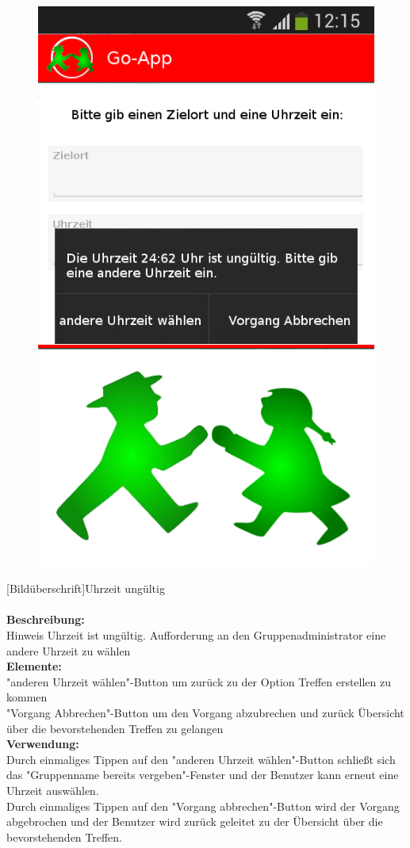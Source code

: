 \begin{figure}
	\includegraphics[scale =1]{resources/images/treffpunkt_erstellen_ungueltig_Zeit.png}
\end{figure}
[Bildüberschrift]Uhrzeit ungültig\\ \\
\textbf{Beschreibung:}\\
Hinweis Uhrzeit ist ungültig. Aufforderung an den Gruppenadministrator eine andere Uhrzeit zu wählen\\
\textbf{Elemente:}\\
"anderen Uhrzeit wählen"-Button um zurück zu der Option Treffen erstellen zu kommen\\
"Vorgang Abbrechen"-Button um den Vorgang abzubrechen und zurück Übersicht über die bevorstehenden Treffen zu gelangen\\
\textbf{Verwendung:}\\
Durch einmaliges Tippen auf den "anderen Uhrzeit wählen"-Button schließt sich das "Gruppenname bereits vergeben"-Fenster und der Benutzer kann erneut eine Uhrzeit auswählen.\\
Durch einmaliges Tippen auf den "Vorgang abbrechen"-Button wird der Vorgang abgebrochen und der Benutzer wird zurück geleitet zu der Übersicht über die bevorstehenden Treffen.\\ \\

